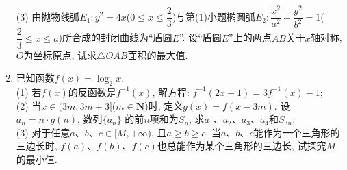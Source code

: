 \documentclass[10pt,a4paper]{article}
\begin{document}
\begin{enumerate}[1.]
(3) 由抛物线弧$E_1:y^2=4x$($0\le x\le \dfrac 23$)与第(1)小题椭圆弧$E_2:\dfrac{x^2}{a^2}+\dfrac{y^2}{b^2}=1$($\dfrac 23\le x\le a$)所合成的封闭曲线为``盾圆$E$''. 设``盾圆$E$''上的两点$AB$关于$x$轴对称, $O$为坐标原点, 试求$\triangle OAB$面积的最大值.
\begin{center}
\end{center}
\item 已知函数$f(x)=\log_2x$.\\
(1) 若$f(x)$的反函数是$f^{-1}(x)$, 解方程: $f^{-1}(2x+1)=3f^{-1}(x)-1$;\\
(2) 当$x\in (3m, 3m+3]$($m\in \mathbf{N}$)时, 定义$g(x)=f(x-3m)$. 设$a_n=n\cdot g(n)$, 数列$\{a_n\}$ 的前$n$项和为$S_n$, 求$a_1$、$a_2$、$a_3$、$a_4$和$S_{3n}$;\\
(3) 对于任意$a$、$b$、$c\in [M,+\infty)$, 且$a\ge b\ge c$. 当$a$、$b$、$c$能作为一个三角形的三边长时, $f(a)$、$f(b)$、$f(c)$也总能作为某个三角形的三边长, 试探究$M$的最小值.



\end{enumerate}
\end{document}
